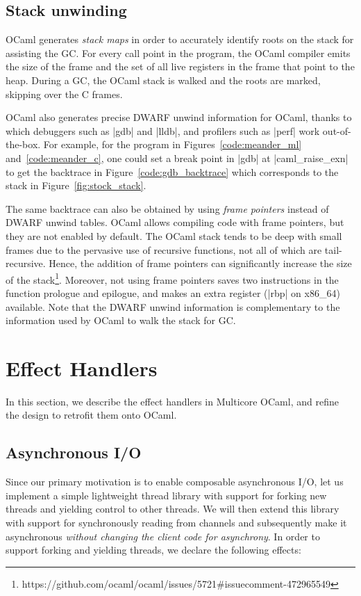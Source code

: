 \documentclass[sigplan,screen]{acmart}
\begin{document}
\subsection{Stack unwinding}
\label{sec:unwind}

OCaml generates \emph{stack maps} in order to accurately identify roots on the
stack for assisting the GC. For every call point in the program, the OCaml
compiler emits the size of the frame and the set of all live registers in the
frame that point to the heap. During a GC, the OCaml stack is walked and the
roots are marked, skipping over the C frames.

OCaml also generates precise DWARF unwind information for OCaml, thanks to
which debuggers such as |gdb| and |lldb|, and profilers such as |perf| work
out-of-the-box. For example, for the program in Figures~\ref{code:meander_ml}
and~\ref{code:meander_c}, one could set a break point in |gdb| at
|caml_raise_exn| to get the backtrace in Figure~\ref{code:gdb_backtrace} which
corresponds to the stack in Figure~\ref{fig:stock_stack}.

The same backtrace can also be obtained by using \emph{frame pointers} instead
of DWARF unwind tables. OCaml allows compiling code with frame pointers, but
they are not enabled by default. The OCaml stack tends to be deep with small
frames due to the pervasive use of recursive functions, not all of which are
tail-recursive. Hence, the addition of frame pointers can significantly
increase the size of the
stack\footnote{https://github.com/ocaml/ocaml/issues/5721\#issuecomment-472965549}.
Moreover, not using frame pointers saves two instructions in the function
prologue and epilogue, and makes an extra register (|rbp| on x86\_64)
available. Note that the DWARF unwind information is complementary to the
information used by OCaml to walk the stack for GC.

\section{Effect Handlers}
\label{sec:refine}

In this section, we describe the effect handlers in Multicore OCaml, and refine
the design to retrofit them onto OCaml.

\subsection{Asynchronous I/O}

Since our primary motivation is to enable composable asynchronous I/O, let us
implement a simple lightweight thread library with support for forking new
threads and yielding control to other threads. We will then extend this library
with support for synchronously reading from channels and subsequently make it
asynchronous \textit{without changing the client code for asynchrony}. In order
to support forking and yielding threads, we declare the following effects:
\end{document}
